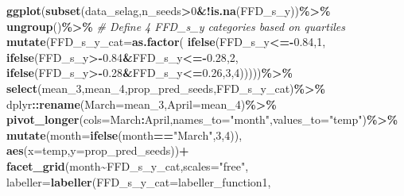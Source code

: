 \documentclass[
]{article}
\newenvironment{Shaded}{\begin{snugshade}}{\end{snugshade}}
\newcommand{\CommentTok}[1]{\textcolor[rgb]{0.56,0.35,0.01}{\textit{#1}}}
\newcommand{\DataTypeTok}[1]{\textcolor[rgb]{0.13,0.29,0.53}{#1}}
\newcommand{\DecValTok}[1]{\textcolor[rgb]{0.00,0.00,0.81}{#1}}
\newcommand{\FloatTok}[1]{\textcolor[rgb]{0.00,0.00,0.81}{#1}}
\newcommand{\KeywordTok}[1]{\textcolor[rgb]{0.13,0.29,0.53}{\textbf{#1}}}
\newcommand{\NormalTok}[1]{#1}
\newcommand{\OperatorTok}[1]{\textcolor[rgb]{0.81,0.36,0.00}{\textbf{#1}}}
\newcommand{\StringTok}[1]{\textcolor[rgb]{0.31,0.60,0.02}{#1}}
\begin{document}
\begin{Shaded}
\begin{Highlighting}[]
\KeywordTok{ggplot}\NormalTok{(}\KeywordTok{subset}\NormalTok{(data\_selag,n\_seeds}\OperatorTok{\textgreater{}}\DecValTok{0}\OperatorTok{\&!}\KeywordTok{is.na}\NormalTok{(FFD\_s\_y))}\OperatorTok{\%\textgreater{}\%}
\StringTok{         }\KeywordTok{ungroup}\NormalTok{()}\OperatorTok{\%\textgreater{}\%}
\StringTok{         }\CommentTok{\# Define 4 FFD\_s\_y categories based on quartiles}
\StringTok{         }\KeywordTok{mutate}\NormalTok{(}\DataTypeTok{FFD\_s\_y\_cat=}\KeywordTok{as.factor}\NormalTok{(}
           \KeywordTok{ifelse}\NormalTok{(FFD\_s\_y}\OperatorTok{\textless{}={-}}\FloatTok{0.84}\NormalTok{,}\DecValTok{1}\NormalTok{,}
                  \KeywordTok{ifelse}\NormalTok{(FFD\_s\_y}\OperatorTok{\textgreater{}{-}}\FloatTok{0.84}\OperatorTok{\&}\NormalTok{FFD\_s\_y}\OperatorTok{\textless{}={-}}\FloatTok{0.28}\NormalTok{,}\DecValTok{2}\NormalTok{,}
                         \KeywordTok{ifelse}\NormalTok{(FFD\_s\_y}\OperatorTok{\textgreater{}{-}}\FloatTok{0.28}\OperatorTok{\&}\NormalTok{FFD\_s\_y}\OperatorTok{\textless{}=}\FloatTok{0.26}\NormalTok{,}\DecValTok{3}\NormalTok{,}\DecValTok{4}\NormalTok{)))))}\OperatorTok{\%\textgreater{}\%}
\StringTok{         }\KeywordTok{select}\NormalTok{(mean\_}\DecValTok{3}\NormalTok{,mean\_}\DecValTok{4}\NormalTok{,prop\_pred\_seeds,FFD\_s\_y\_cat)}\OperatorTok{\%\textgreater{}\%}
\StringTok{         }\NormalTok{dplyr}\OperatorTok{::}\KeywordTok{rename}\NormalTok{(}\DataTypeTok{March=}\NormalTok{mean\_}\DecValTok{3}\NormalTok{,}\DataTypeTok{April=}\NormalTok{mean\_}\DecValTok{4}\NormalTok{)}\OperatorTok{\%\textgreater{}\%}
\StringTok{         }\KeywordTok{pivot\_longer}\NormalTok{(}\DataTypeTok{cols=}\NormalTok{March}\OperatorTok{:}\NormalTok{April,}\DataTypeTok{names\_to=}\StringTok{"month"}\NormalTok{,}\DataTypeTok{values\_to=}\StringTok{"temp"}\NormalTok{)}\OperatorTok{\%\textgreater{}\%}
\StringTok{         }\KeywordTok{mutate}\NormalTok{(}\DataTypeTok{month=}\KeywordTok{ifelse}\NormalTok{(month}\OperatorTok{==}\StringTok{"March"}\NormalTok{,}\DecValTok{3}\NormalTok{,}\DecValTok{4}\NormalTok{)),}
       \KeywordTok{aes}\NormalTok{(}\DataTypeTok{x=}\NormalTok{temp,}\DataTypeTok{y=}\NormalTok{prop\_pred\_seeds))}\OperatorTok{+}
\StringTok{  }\KeywordTok{facet\_grid}\NormalTok{(month}\OperatorTok{\textasciitilde{}}\NormalTok{FFD\_s\_y\_cat,}\DataTypeTok{scales=}\StringTok{"free"}\NormalTok{,}
             \DataTypeTok{labeller=}\KeywordTok{labeller}\NormalTok{(}\DataTypeTok{FFD\_s\_y\_cat=}\NormalTok{labeller\_function1,}

\end{Highlighting}
\end{Shaded}
\end{document}
